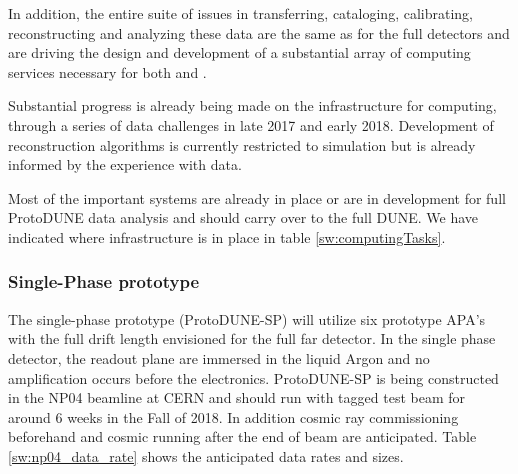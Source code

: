 In addition, the entire suite of issues in transferring, cataloging, calibrating, reconstructing and analyzing these data are the same as for the full detectors and are driving the design and development of a substantial array of computing services necessary for both  and  .

Substantial progress is already being made on the infrastructure for computing, through a series of data challenges in late 2017 and early 2018. Development of reconstruction algorithms is currently restricted to simulation but is already informed by the experience with   data.


Most of the important systems are already in place or are in development for full ProtoDUNE data analysis and should carry over to the full DUNE.
We have indicated where infrastructure is in place in  table  \ref{sw:computingTasks}.




\subsubsection{Single-Phase prototype}

The single-phase prototype (ProtoDUNE-SP) will utilize six prototype APA's with the full drift length envisioned for the full far detector. In the single phase detector, the readout plane are immersed in the liquid Argon and no amplification occurs before the electronics.    ProtoDUNE-SP is being constructed in the NP04 beamline at CERN and should run with tagged test beam for around 6 weeks in the Fall of 2018.  In addition cosmic ray commissioning beforehand and cosmic running after the end of beam are anticipated.  Table \ref{sw:np04_data_rate}
shows the anticipated data rates and sizes. 


